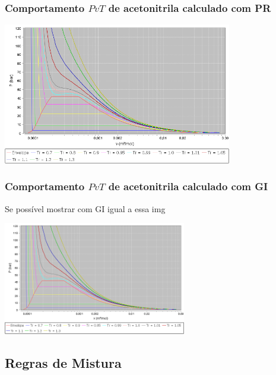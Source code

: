 \documentclass[aspectratio=169]{beamer}
\begin{document}
\begin{frame}
	\frametitle{Comportamento $PvT$ de acetonitrila calculado com PR}
	\begin{center}
		\includegraphics[width=0.75\textwidth]{img/Acetonitrila.png} 
	\end{center}
\end{frame}

\begin{frame}
	\frametitle{Comportamento $PvT$ de acetonitrila calculado com GI}
	Se possível mostrar com GI igual a essa img
	\begin{center}
		\includegraphics[width=0.6\textwidth]{img/Acetonitrila.png} 
	\end{center}
\end{frame}

\subsection{Regras de Mistura}
\end{document}
